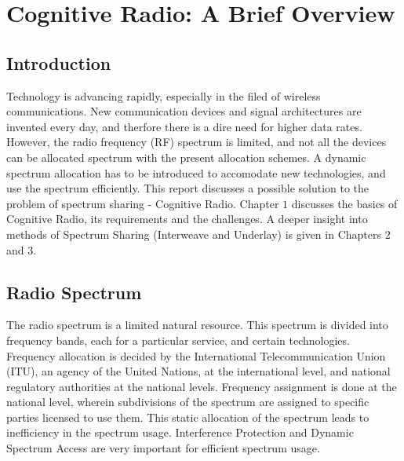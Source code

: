 \chapter{Cognitive Radio: A Brief Overview}

\section{Introduction}

Technology is advancing rapidly, especially
in the filed of wireless communications. New communication devices and signal architectures are invented
every day, and therfore there is a dire need for higher data rates. However, the
radio frequency (RF) spectrum is limited, and not all the devices can be
allocated spectrum with the present allocation schemes. A dynamic spectrum
allocation has to be introduced to accomodate new technologies, and use the
spectrum efficiently. This report discusses a possible solution to the problem
of spectrum sharing - Cognitive Radio. Chapter $1$ discusses the basics of
Cognitive Radio, its requirements and the challenges. A deeper insight into
methods of Spectrum Sharing (Interweave and Underlay) is given in Chapters $2$
and $3$.

\section{Radio Spectrum}
The radio spectrum is a limited natural resource\cite{haykin}. This spectrum is
divided into frequency bands, each for a particular service, and certain technologies.
Frequency allocation is decided by the International Telecommunication Union
(ITU), an agency of the United Nations, at the international level, and national
regulatory authorities at the national levels\cite{doyle}. Frequency assignment
is done at the national level, wherein subdivisions of the spectrum are assigned to
specific parties licensed to use them. This static allocation of the spectrum
leads to inefficiency in the spectrum usage. Interference Protection and Dynamic
Spectrum Access are very important for efficient spectrum usage.

